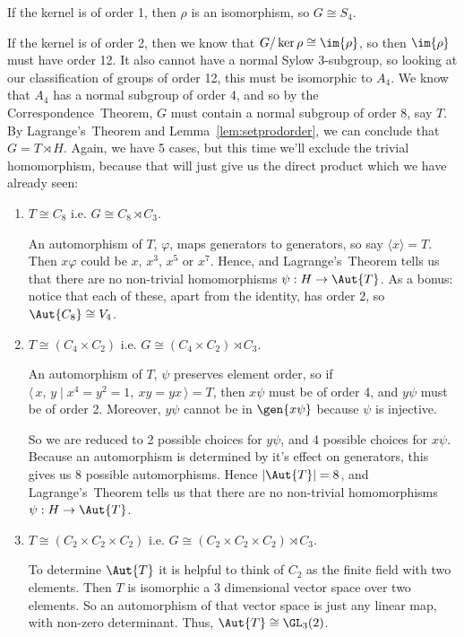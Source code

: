 If the kernel is of order 1, then \(\rho\) is an isomorphism, so \(G \cong S_4\).

If the kernel is of order 2, then we know that \(G/\ker{\rho} \cong \im{\rho}\), so then \(\im{\rho}\) must have order
12.
It also cannot have a normal Sylow 3-subgroup, so looking at our classification of groups of order 12, this must be
isomorphic to \(A_4\).
We know that \(A_4\) has a normal subgroup of order 4, and so by the Correspondence~Theorem, \(G\) must contain a normal
subgroup of order 8, say \(T\).
By Lagrange's~Theorem and Lemma~\ref{lem:setprodorder}, we can conclude that \(G = T \rtimes H\).
Again, we have 5 cases, but this time we'll exclude the trivial homomorphism, because that will just give us the direct
product which we have already seen:


\begin{enumerate}
    \item \(T \cong C_8\) i.e. \(G \cong C_8 \rtimes C_3\).

        An automorphism of \(T\), \(\varphi\), maps generators to generators, so say \(\langle x \rangle = T\).
        Then \(x\varphi\) could be \(x\), \(x^3\), \(x^5\) or \(x^7\).
        Hence, and Lagrange's~Theorem tells us that there are no non-trivial homomorphisms \(\psi:H \to \Aut{T}\).
        As a bonus: notice that each of these, apart from the identity, has order 2, so \(\Aut{C_8} \cong V_4\).
    \item \(T \cong (C_4 \times C_2)\) i.e. \(G \cong (C_4 \times C_2) \rtimes C_3\).

        An automorphism of \(T\), \(\psi\) preserves element order, so if \(\langle\,x,\,y \mid x^4 = y^2 = 1,\ xy =
        yx\,\rangle = T\), then \(x\psi\) must be of order 4, and \(y\psi\) must be of order 2.
        Moreover, \(y\psi\) cannot be in \(\gen{x\psi}\) because \(\psi\) is injective.

        So we are reduced to 2 possible choices for \(y\psi\), and 4 possible choices for \(x\psi\).
        Because an automorphism is determined by it's effect on generators, this gives us 8 possible automorphisms.
        Hence \(|\Aut{T}| = 8\), and Lagrange's~Theorem tells us that there are no non-trivial homomorphisms \(\psi:H
        \to \Aut{T}\).
    \item \(T \cong (C_2 \times C_2 \times C_2)\) i.e. \(G \cong (C_2 \times C_2 \times C_2) \rtimes C_3\).

        To determine \(\Aut{T}\) it is helpful to think of \(C_2\) as the finite field with two elements.
        Then \(T\) is isomorphic a 3 dimensional vector space over two elements.
        So an automorphism of that vector space is just any linear map, with non-zero determinant.
        Thus, \(\Aut{T} \cong \GL_3(2)\).


\end{enumerate}
